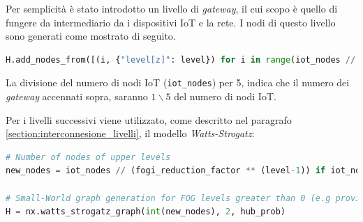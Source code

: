 Per semplicità è stato introdotto un livello di \textit{gateway}, il cui scopo è quello di fungere da intermediario da i dispositivi IoT e la rete. I nodi di questo livello sono generati come mostrato di seguito.

\begin{lstlisting}[language=python]
H.add_nodes_from([(i, {"level[z]": level}) for i in range(iot_nodes // 5)])
\end{lstlisting}

La divisione del numero di nodi IoT (\texttt{iot\_nodes}) per 5, indica che il numero dei \textit{gateway} accennati sopra, saranno $1\backslash 5$ del numero di nodi IoT.

Per i livelli successivi viene utilizzato, come descritto nel paragrafo \ref{section:interconnesione_livelli}, il modello \textit{Watts-Strogatz}:
\begin{lstlisting}[language=python]
# Number of nodes of upper levels
new_nodes = iot_nodes // (fogi_reduction_factor ** (level-1)) if iot_nodes // (fogi_reduction_factor**(level-1)) >= 2 else 2
                
# Small-World graph generation for FOG levels greater than 0 (e.g provincial fog nodes)
H = nx.watts_strogatz_graph(int(new_nodes), 2, hub_prob)
\end{lstlisting}




